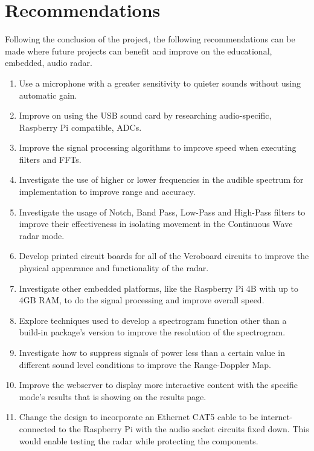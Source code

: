 \chapter{Recommendations}\label{chap:Recommendations}
Following the conclusion of the project, the following recommendations can be made where future projects can benefit and improve on the educational, embedded, audio radar.

\begin{enumerate}
\item Use a microphone with a greater sensitivity to quieter sounds without using automatic gain.
\item Improve on using the USB sound card by researching audio-specific, Raspberry Pi compatible, ADCs.
\item Improve the signal processing algorithms to improve speed when executing filters and FFTs.
\item Investigate the use of higher or lower frequencies in the audible spectrum for implementation to improve range and accuracy.
\item Investigate the usage of Notch, Band Pass, Low-Pass and High-Pass filters to improve their effectiveness in isolating movement in the Continuous Wave radar mode.
\item Develop printed circuit boards for all of the Veroboard circuits to improve the physical appearance and functionality of the radar.
\item Investigate other embedded platforms, like the Raspberry Pi 4B with up to 4GB RAM, to do the signal processing and improve overall speed.
\item Explore techniques used to develop a spectrogram function other than a build-in package's version to improve the resolution of the spectrogram.
\item Investigate how to suppress signals of power less than a certain value in different sound level conditions to improve the Range-Doppler Map.
\item Improve the webserver to display more interactive content with the specific mode's results that is showing on the results page.
\item Change the design to incorporate an Ethernet CAT5 cable to be internet-connected to the Raspberry Pi with the audio socket circuits fixed down. This would enable testing the radar while protecting the components.
\end{enumerate}


\newpage